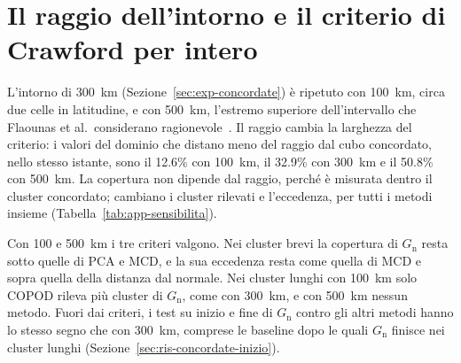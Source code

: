 
\section{Il raggio dell'intorno e il criterio di Crawford per intero}
\label{app:sens-raggio}

L'intorno di 300~km (Sezione~\ref{sec:exp-concordate}) è ripetuto con 100~km, circa due celle in latitudine, e con 500~km, l'estremo superiore dell'intervallo che Flaounas et al.\ considerano ragionevole~\cite{flaounas2023composite}. Il raggio cambia la larghezza del criterio: i valori del dominio che distano meno del raggio dal cubo concordato, nello stesso istante, sono il 12.6\% con 100~km, il 32.9\% con 300~km e il 50.8\% con 500~km. La copertura non dipende dal raggio, perché è misurata dentro il cluster concordato; cambiano i cluster rilevati e l'eccedenza, per tutti i metodi insieme (Tabella~\ref{tab:app-sensibilita}).

Con 100 e 500~km i tre criteri valgono. Nei cluster brevi la copertura di $G_{\mathrm{n}}$ resta sotto quelle di PCA e MCD, e la sua eccedenza resta come quella di MCD e sopra quella della distanza dal normale. Nei cluster lunghi con 100~km solo COPOD rileva più cluster di $G_{\mathrm{n}}$, come con 300~km, e con 500~km nessun metodo. Fuori dai criteri, i test su inizio e fine di $G_{\mathrm{n}}$ contro gli altri metodi hanno lo stesso segno che con 300~km, comprese le baseline dopo le quali $G_{\mathrm{n}}$ finisce nei cluster lunghi (Sezione~\ref{sec:ris-concordate-inizio}).

